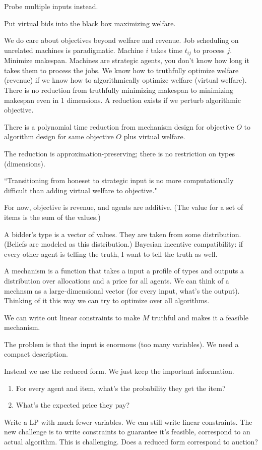 Probe multiple inputs instead.

Put virtual bids into the black box maximizing welfare.

We do care about objectives beyond welfare and revenue. Job scheduling on unrelated machines is paradigmatic. Machine $i$ takes time $t_{ij}$ to process $j$. Minimize makespan. Machines are strategic agents, you don't know how long it takes them to process the jobs.
We know how to truthfully optimize welfare (revenue) if we know how to algorithmically optimize welfare (virtual welfare). There is no reduction from truthfully minimizing makespan to minimizing makespan even in 1 dimensions. A reduction exists if we perturb algorithmic objective. 

\begin{thm}
There is a polynomial time reduction from mechanism design for objective $O$ to algorithm design for same objective $O$ plus virtual welfare.
\end{thm}
The reduction is approximation-preserving; there is no restriction on types (dimensions).

``Transitioning from honeset to strategic input is no more computationally difficult than adding virtual welfare to objective."

For now, objective is revenue, and agents are additive. (The value for a set of items is the sum of the values.)

A bidder's type is a vector of values. They are taken from some distribution. (Beliefs are modeled as this distribution.) Bayesian incentive compatibility: if every other agent is telling the truth, I want to tell the truth as well.

A mechanism is a function that takes a input a profile of types and outputs a distribution over allocations and a price for all agents. We can think of a mechnsm as a large-dimensional vector (for every input, what's the output). Thinking of it this way we can try to optimize over all algorithms. 

We can write out linear constraints to make $M$ truthful and makes it a feasible mechanism.

The problem is that the input is enormous (too many variables). We need a compact description.

Instead we use the reduced form. We just keep the important information.
\begin{enumerate}
\item
For every agent and item, what's the probability they get the item?
\item
What's the expected price they pay?
\end{enumerate}
Write a LP with much fewer variables. We can still write linear constraints. The new challenge is to write constraints to guarantee it's feasible, correspond to an actual algorithm. This is challenging. Does a reduced form correspond to auction?

